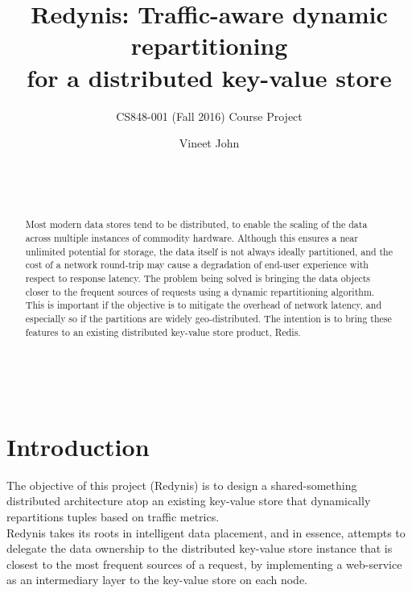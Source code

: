 \documentclass{sig-alternate}
\begin{document}
\title{Redynis: Traffic-aware dynamic repartitioning\\for a distributed key-value store}
\subtitle{CS848-001 (Fall 2016) Course Project}


\author{
	\alignauthor Vineet John\\
	\\
	\\
	\\
}


\maketitle
\begin{abstract}
Most modern data stores tend to be distributed, to enable the scaling of the data across multiple instances of commodity hardware. Although this ensures a near unlimited potential for storage, the data itself is not always ideally partitioned, and the cost of a network round-trip may cause a degradation of end-user experience with respect to response latency. The problem being solved is bringing the data objects closer to the frequent sources of requests using a dynamic repartitioning algorithm. This is important if the objective is to mitigate the overhead of network latency, and especially so if the partitions are widely geo-distributed. The intention is to bring these features to an existing distributed key-value store product, Redis\cite{redis-website}.\\
\end{abstract}


\\


\section{Introduction}
The objective of this project (Redynis) is to design a shared-something distributed architecture atop an existing key-value store that dynamically repartitions tuples based on traffic metrics.\\

Redynis takes its roots in intelligent data placement, and in essence, attempts to delegate the data ownership to the distributed key-value store instance that is closest to the most frequent sources of a request, by implementing a web-service as an intermediary layer to the key-value store on each node.\\
\end{document}

